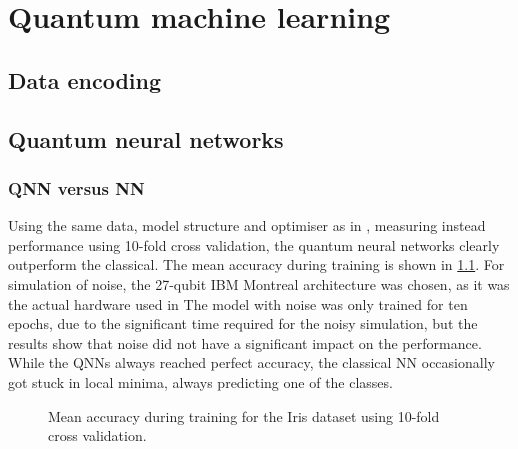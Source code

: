 \chapter{Quantum machine learning}

\section{Data encoding}

\section{Quantum neural networks}

\subsection{QNN versus NN}
Using the same data, model structure and optimiser as in \cite{abbas2021}, measuring instead performance using 10-fold cross validation, the quantum neural networks clearly outperform the classical. The mean accuracy during training is shown in \cref{fig:iris_training}. For simulation of noise, the 27-qubit IBM Montreal architecture was chosen, as it was the actual hardware used in \cite{abbas2021} The model with noise was only trained for ten epochs, due to the significant time required for the noisy simulation, but the results show that noise did not have a significant impact on the performance. While the QNNs always reached perfect accuracy, the classical NN occasionally got stuck in local minima, always predicting one of the classes.

\begin{figure}
    \centering
    \caption{Mean accuracy during training for the Iris dataset using 10-fold cross validation.}
    \label{fig:iris_training}
\end{figure}

